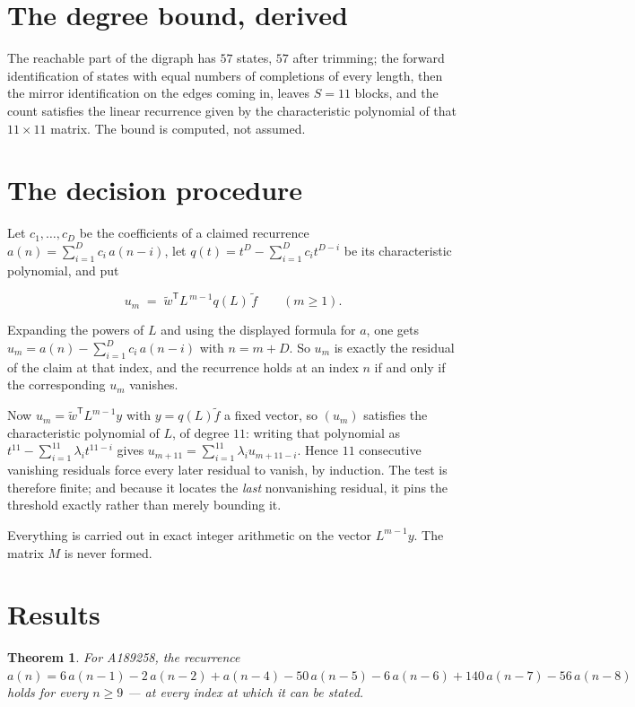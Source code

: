 \documentclass[11pt]{article}
\newtheorem{theorem}{Theorem}
\theoremstyle{definition}
\begin{document}
\section{The degree bound, derived}

The reachable part of the digraph has $57$ states, $57$ after trimming; the forward identification of states with equal numbers of completions of every length, then the mirror identification on the edges coming in, leaves $S = 11$ blocks, and the count satisfies the linear recurrence given by the characteristic polynomial of that $11\times11$ matrix. The bound is computed, not assumed.

\section{The decision procedure}

Let $c_1,\dots,c_D$ be the coefficients of a claimed recurrence $a(n) = \sum_{i=1}^{D} c_i\,a(n-i)$, let $q(t) = t^{D} - \sum_{i=1}^{D} c_i t^{D-i}$ be its characteristic polynomial, and put

\[u_m \;=\; \tilde w^{\mathsf T} L^{\,m-1} q(L)\,\tilde f \qquad (m \ge 1).\]

Expanding the powers of $L$ and using the displayed formula for $a$, one gets $u_m = a(n) - \sum_{i=1}^{D} c_i\,a(n-i)$ with $n = m + D$. So $u_m$ is exactly the residual of the claim at that index, and the recurrence holds at an index $n$ if and only if the corresponding $u_m$ vanishes.

Now $u_m = \tilde w^{\mathsf T} L^{m-1} y$ with $y = q(L)\tilde f$ a fixed vector, so $(u_m)$ satisfies the characteristic polynomial of $L$, of degree $11$: writing that polynomial as $t^{11} - \sum_{i=1}^{11} \lambda_i t^{11-i}$ gives $u_{m+11} = \sum_{i=1}^{11} \lambda_i u_{m+11-i}$. Hence $11$ consecutive vanishing residuals force every later residual to vanish, by induction. The test is therefore finite; and because it locates the {\itshape last} nonvanishing residual, it pins the threshold exactly rather than merely bounding it.

Everything is carried out in exact integer arithmetic on the vector $L^{m-1}y$. The matrix $M$ is never formed.

\section{Results}

\begin{theorem} For A189258, the recurrence $a(n) = 6\,a(n-1) - 2\,a(n-2) + a(n-4) - 50\,a(n-5) - 6\,a(n-6) + 140\,a(n-7) - 56\,a(n-8)$ holds for every $n \ge 9$ --- at every index at which it can be stated.\end{theorem}
\end{document}
